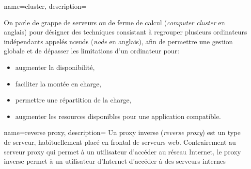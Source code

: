 {
    name=cluster,
    description={On parle de grappe de serveurs ou de ferme de calcul (\textit{computer cluster} en anglais) 
        pour désigner des techniques consistant à regrouper plusieurs ordinateurs indépendants appelés nœuds (\textit{node} en anglais),
    afin de permettre une gestion globale et de dépasser les limitations d'un ordinateur pour:
    \begin{itemize}
        \item augmenter la disponibilité,
        \item faciliter la montée en charge,
        \item permettre une répartition de la charge,
        \item augmenter les resources disponibles pour une application compatible. 
    \end{itemize}
}
}
{
    name=reverse proxy,
    description={
        Un proxy inverse (\textit{reverse proxy}) est un type de serveur, habituellement placé en frontal de serveurs web.
        Contrairement au serveur proxy qui permet à un utilisateur d'accéder au réseau Internet, le proxy inverse permet à un utilisateur d'Internet d'accéder à des serveurs internes
    }
}
